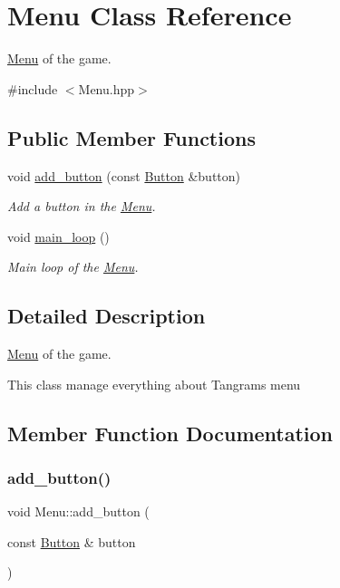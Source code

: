 \hypertarget{classMenu}{}\section{Menu Class Reference}
\label{classMenu}


\hyperlink{classMenu}{Menu} of the game.  




{\ttfamily \#include $<$Menu.\+hpp$>$}

\subsection*{Public Member Functions}
\begin{DoxyCompactItemize}
\item 
void \hyperlink{classMenu_aaf6a2fb4408f8d5b5bdd7e633da53193}{add\+\_\+button} (const \hyperlink{classButton}{Button} \&button)
\begin{DoxyCompactList}\small\item\em Add a button in the \hyperlink{classMenu}{Menu}. \end{DoxyCompactList}\item 
\mbox{\label{classMenu_a02baf39291517cea771a2e1cffed960e}} 
void \hyperlink{classMenu_a02baf39291517cea771a2e1cffed960e}{main\+\_\+loop} ()
\begin{DoxyCompactList}\small\item\em Main loop of the \hyperlink{classMenu}{Menu}. \end{DoxyCompactList}\end{DoxyCompactItemize}


\subsection{Detailed Description}
\hyperlink{classMenu}{Menu} of the game. 

This class manage everything about Tangram\textquotesingle{}s menu 

\subsection{Member Function Documentation}
\mbox{\label{classMenu_aaf6a2fb4408f8d5b5bdd7e633da53193}} 
\subsubsection{\texorpdfstring{add\+\_\+button()}{add\_button()}}
{\footnotesize\ttfamily void Menu\+::add\+\_\+button (\begin{DoxyParamCaption}\item[{const \hyperlink{classButton}{Button} \&}]{button }\end{DoxyParamCaption})}



